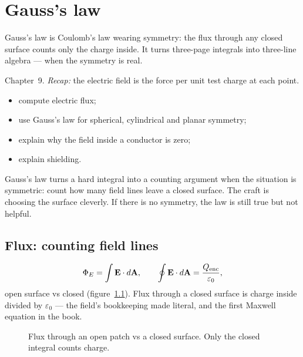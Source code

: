 \chapter{Gauss's law}\label{ch:gauss}

Gauss's law is Coulomb's law wearing symmetry: the flux through any
closed surface counts only the charge inside. It turns three-page
integrals into three-line algebra --- when the symmetry is real.

\begin{rulebox}
Chapter~9. \emph{Recap:} the electric field is the force per unit test charge at each point.
\end{rulebox}
\begin{wins}
\begin{itemize}
\item compute electric flux;
\item use Gauss's law for spherical, cylindrical and planar symmetry;
\item explain why the field inside a conductor is zero;
\item explain shielding.
\end{itemize}
\end{wins}
\begin{principle}
Gauss's law turns a hard integral into a counting argument when the situation is symmetric: count how many field lines leave a closed surface. The craft is choosing the surface cleverly. If there is no symmetry, the law is still true but not helpful.
\end{principle}

\section{Flux: counting field lines}\label{sec:ga-flux}

\begin{equation}
  \Phi_E=\int\mathbf E\cdot d\mathbf A,\qquad
  \oint\mathbf E\cdot d\mathbf A=\frac{Q_{\rm enc}}{\varepsilon_0},
  \label{eq:gauss}
\end{equation}
open surface vs closed (figure~\ref{fig:flux}). Flux through a closed
surface is charge inside divided by $\varepsilon_0$ --- the field's
bookkeeping made literal, and the first Maxwell equation in the book.

\begin{figure}[htbp]\centering

\caption{Flux through an open patch vs a closed surface. Only the closed
integral counts charge.}
\label{fig:flux}
\end{figure}

